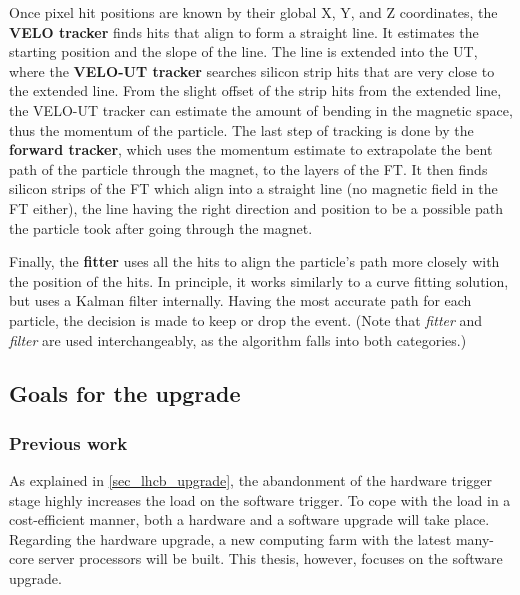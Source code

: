\documentclass[12pt]{article}
\begin{document}
Once pixel hit positions are known by their global X, Y, and Z coordinates, the \textbf{VELO tracker} finds hits that align to form a straight line. It estimates the starting position and the slope of the line. The line is extended into the UT, where the \textbf{VELO-UT tracker} searches silicon strip hits that are very close to the extended line. From the slight offset of the strip hits from the extended line, the VELO-UT tracker can estimate the amount of bending in the magnetic space, thus the momentum of the particle. The last step of tracking is done by the \textbf{forward tracker}, which uses the momentum estimate to extrapolate the bent path of the particle through the magnet, to the layers of the FT. It then finds silicon strips of the FT which align into a straight line (no magnetic field in the FT either), the line having the right direction and position to be a possible path the particle took after going through the magnet.

Finally, the \textbf{fitter} uses all the hits to align the particle's path more closely with the position of the hits. In principle, it works similarly to a curve fitting solution, but uses a Kalman filter\cite{kalman_filter_wiki}\cite{kalman_filter_lhcb} internally. Having the most accurate path for each particle, the decision is made to keep or drop the event. (Note that \textit{fitter} and \textit{filter} are used interchangeably, as the algorithm falls into both categories.)


\subsection{Goals for the upgrade}

\subsubsection{Previous work}

As explained in \ref{sec_lhcb_upgrade}, the abandonment of the hardware trigger stage highly increases the load on the software trigger. To cope with the load in a cost-efficient manner, both a hardware and a software upgrade will take place. Regarding the hardware upgrade, a new computing farm with the latest many-core server processors will be built. This thesis, however, focuses on the software upgrade.
\end{document}
